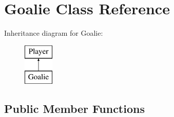 \hypertarget{classGoalie}{
\section{Goalie Class Reference}
\label{classGoalie}
}
Inheritance diagram for Goalie:\begin{figure}[H]
\begin{center}
\leavevmode
\includegraphics[height=2.000000cm]{classGoalie}
\end{center}
\end{figure}
\subsection*{Public Member Functions}
